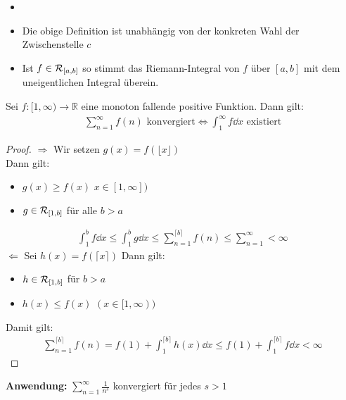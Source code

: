\begin{Bemerkung}{
	\begin{itemize}
		\item[ ]
		\item Die obige Definition ist unabhängig von der konkreten Wahl der 
		Zwischenstelle $c$
		\item Ist $f \in \mathcal{R}_{[{a},{b}]}$ so stimmt das Riemann-Integral von $f$ über 
		$[a,b]$ mit dem uneigentlichen Integral überein.
	\end{itemize}
}\end{Bemerkung}

\begin{Satz}{
	Sei $f : [1, \infty) \rightarrow \mathbb{R}$ eine monoton fallende 
	positive Funktion. 
	Dann gilt:
	\begin{align*}
		\sum_{n = 1}^{\infty} f(n) \text{ konvergiert} \Leftrightarrow 
		\int_1^{\infty} f \dd{x} \text{ existiert}
	\end{align*}
}\end{Satz}

\begin{proof}
	$\Rightarrow$ Wir setzen $g(x) = f( \lfloor x \rfloor )$ \\
	Dann gilt:
	\begin{itemize}
		\item $g(x) \geq f(x)$ $x \in [1, \infty])$
		\item $g \in \mathcal{R}_{[{1},{b}]}$ für alle $ b > a$
	\end{itemize}
	\begin{align*}
		\int_1^b f \dd{x} \leq \int_1^b g \dd{x} \leq \sum_{n = 1}^{\lceil b \rceil}
		f(n) \leq \sum_{n=1}^{\infty} < \infty 
	\end{align*}
	$\Leftarrow$ Sei $ h(x) = f(\lceil x \rceil )$ Dann gilt:
	\begin{itemize}
		\item $h \in \mathcal{R}_{[{1},{b}]} $ für $b >a$
		\item $h(x) \leq f(x) $ $ (x \in [1, \infty)) $
	\end{itemize}
	Damit gilt:
	\begin{align*}
		\sum_{n = 1}^{\lceil b \rceil }f(n) = f(1) + 
		\int_1^{\lceil b \rceil}h(x) \dd{x} 
		\leq f(1) + \int_1^{\lceil b \rceil} f \dd{x} < \infty
	\end{align*}
\end{proof}

\textbf{Anwendung:} $\sum_{n=1}^{\infty}\frac{1}{n^s}$ konvergiert für jedes $s > 1$

